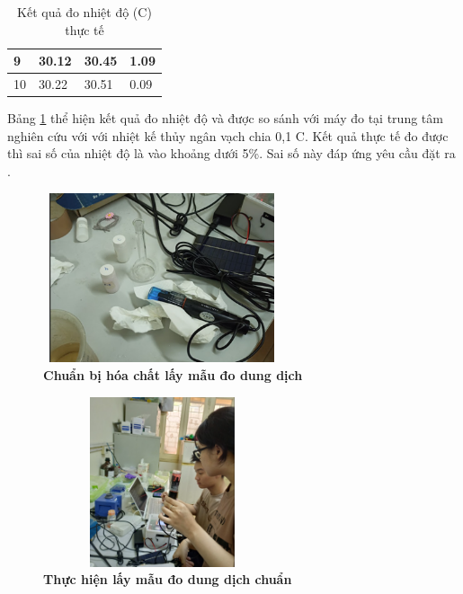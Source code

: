 \documentclass{article} %
\begin{document}
\begin{itemize}
\begin{itemize}[label=$\ast$]
\begin{table}[H]
\begin{tabular}{|l|l|l|l|}
					9               & 30.12                                                               & 30.45                                                                      & 1.09            \\ \hline
					10              & 30.22                                                               & 30.51                                                                      & 0.09            \\ \hline
				\end{tabular}
				\caption{Kết quả đo nhiệt độ (\textdegree C) thực tế}
				\label{bang7}
			\end{table}
			
			Bảng \ref{bang7} thể hiện kết quả đo nhiệt độ và được so sánh với máy đo tại trung tâm nghiên cứu với với nhiệt kế thủy ngân vạch chia 0,1 \textdegree C. Kết quả thực tế đo được thì sai số của nhiệt độ là vào khoảng dưới 5\%. Sai số này đáp ứng yêu cầu đặt ra \cite{phat}.
			\begin{figure}[!ht]
				\centering
				\includegraphics[width=7cm,height=5cm]{Images/ChddPh.png}
				\caption[ Chuẩn bị hóa chất lấy mẫu đo dung dịch ]{\bfseries \fontsize{12pt}{0pt}\selectfont Chuẩn bị hóa chất lấy mẫu đo dung dịch}
				\label{ChddPh}
			\end{figure}
			
			\begin{figure}[!ht]
				\centering
				\includegraphics[width=7cm,height=5cm]{Images/thlmddc.png}
				\caption[ Thực hiện lấy mẫu đo dung dịch chuẩn ]{\bfseries \fontsize{12pt}{0pt}\selectfont Thực hiện lấy mẫu đo dung dịch chuẩn}
				\label{thlmddc}
			\end{figure}
			

\end{itemize}
\end{itemize}
\end{document}
